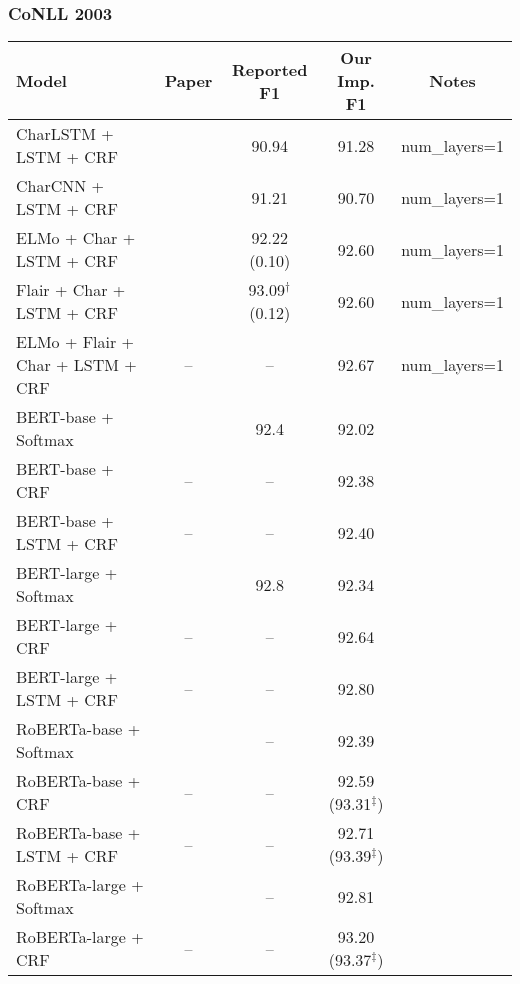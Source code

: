\documentclass{article}
\begin{document}
\subsubsection{CoNLL 2003}
\begin{table}[H]
    \centering
    \begin{tabular}{lcccc}
    \toprule
    Model & Paper & Reported F1 & Our Imp. F1 & Notes \\
    \midrule
    CharLSTM + LSTM + CRF       & \citet{lample2016neural} & 90.94         & 91.28 & num\_layers=1 \\
    CharCNN + LSTM + CRF        & \citet{ma2016end}        & 91.21         & 90.70 & num\_layers=1 \\
    ELMo + Char + LSTM + CRF    & \citet{peters2018deep}   & 92.22 (0.10)  & 92.60 & num\_layers=1 \\
    Flair + Char + LSTM + CRF   & \citet{akbik2018contextual} & 93.09$^\dagger$ (0.12) & 92.60 & num\_layers=1 \\
    ELMo + Flair + Char + LSTM + CRF & --                  & --            & 92.67 & num\_layers=1 \\
    \midrule
    BERT-base + Softmax         & \citet{devlin2019bert} & 92.4          & 92.02 \\ 
    BERT-base + CRF             & --                     & --            & 92.38 \\ 
    BERT-base + LSTM + CRF      & --                     & --            & 92.40 \\ 
    BERT-large + Softmax        & \citet{devlin2019bert} & 92.8          & 92.34 \\ 
    BERT-large + CRF            & --                     & --            & 92.64 \\ 
    BERT-large + LSTM + CRF     & --                     & --            & 92.80 \\ 
    \midrule
    RoBERTa-base + Softmax      & \citet{liu2019roberta} & --            & 92.39 \\ 
    RoBERTa-base + CRF          & --                     & --            & 92.59 (93.31$^\ddagger$) \\
    RoBERTa-base + LSTM + CRF   & --                     & --            & 92.71 (93.39$^\ddagger$) \\
    RoBERTa-large + Softmax     & \citet{liu2019roberta} & --            & 92.81 \\
    RoBERTa-large + CRF         & --                     & --            & 93.20 (93.37$^\ddagger$) \\

\end{tabular}
\end{table}
\end{document}
